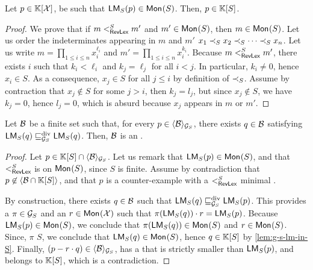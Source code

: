 \begin{lemma}
    \label{lem:g-s-lm-in-S}
    Let $p \in \poly{\K}{\X}$,
    be such that $\lm[S](p) \in \mon{S}$.
    Then, $p \in \poly{\K}{S}$.
\end{lemma}
\begin{proof}
    We prove that if $m \revlex[S] m'$ and $m' \in \mon{S}$, then $m \in
    \mon{S}$. Let us order the indeterminates appearing in $m$ and $m'$ $x_1
    \sOrderLt x_2 \sOrderLt \cdots \sOrderLt x_n$. Let us write $m = \prod_{1
    \leq i \leq n} x_i^{\ell_i}$ and $m' = \prod_{1 \leq i \leq n} x_i^{k_i}$.
    Because $m \revlex[S] m'$, there exists $i$ such that $k_i < \ell_i$ and
    $k_j = \ell_j$ for all $i < j$. In particular, $k_i \neq 0$, hence $x_i \in
    S$. As a consequence, $x_j \in S$ for all $j \leq i$ by definition of
    $\sOrderLt$. Assume by contraction that $x_j \not\in S$ for some $j > i$,
    then $k_j = l_j$, but since $x_j \not\in S$, we have $k_j = 0$, hence $l_j
    = 0$, which is absurd because $x_j$ appears in $m$ or $m'$.
\end{proof}

\begin{lemma}
    \label{lem:g-s-gb-is-gb}
    Let $\Basis$ be a finite set such that,
    for every $p \in \gen{\Basis}{\group_S}$,
    there exists $q \in \Basis$
    satisfying $\lm[S](q) \gdivleq[\group_S] \lm[S](q)$.
    Then, $\Basis$ is an .
\end{lemma}
\begin{proof}
    Let $p \in \poly{\K}{S} \cap \gen{\Basis}{\group_S}$.
    Let us remark that $\lm[S](p) \in \mon{S}$,
    and that $\revlex[S]$ is  on $\mon{S}$,
    since $S$ is finite. Assume by contradiction that 
    $p \not \in \gen{\Basis \cap \poly{\K}{S}}{}$,
    and that $p$ is a counter-example with a $\revlex[S]$ minimal
    .

    By construction, there exists $q \in \Basis$ such that $\lm[S](q)
    \gdivleq[\group_S] \lm[S](p)$. This provides a $\pi \in \group_S$ and an $r
    \in \mon{\X}$ such that $\pi(\lm[S](q)) \cdot r = \lm[S](p)$.
    Because $\lm[S](p) \in \mon{S}$, we conclude 
    that $\pi(\lm[S](q)) \in \mon{S}$ and $r \in \mon{S}$.
    Since, $\pi$  $S$, we conclude that $\lm[S](q) \in \mon{S}$,
    hence $q \in \poly{\K}{S}$ by \cref{lem:g-s-lm-in-S}.
    Finally, 
    $(p - r \cdot q) \in \gen{\Basis}{\group_S}$,
    has a  that is strictly smaller than $\lm[S](p)$,
    and belongs to $\poly{\K}{S}$, which is a contradiction.
\end{proof}

